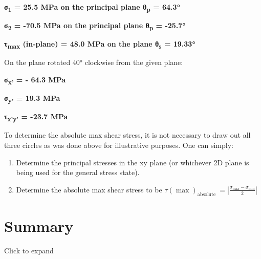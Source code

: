 \documentclass[
  letterpaper,
  DIV=11,
  numbers=noendperiod]{scrreprt}
\begin{document}
\begin{tcolorbox}
\begin{tcolorbox}
\textbf{σ\textsubscript{1} = 25.5 MPa on the principal plane
θ\textsubscript{p} = 64.3°}

\textbf{σ\textsubscript{2} = -70.5 MPa on the principal plane
θ\textsubscript{p} = -25.7°}

\textbf{τ\textsubscript{max} (in-plane) = 48.0 MPa on the plane
θ\textsubscript{s} = 19.33°}

On the plane rotated 40° clockwise from the given plane:

\textbf{σ\textsubscript{x'} = - 64.3 MPa}

\textbf{σ\textsubscript{y'} = 19.3 MPa}

\textbf{τ\textsubscript{x'y'} = -23.7 MPa}

\end{tcolorbox}

\end{tcolorbox}

\begin{tcolorbox}[enhanced jigsaw, breakable, opacityback=0, toptitle=1mm, left=2mm, colback=white, opacitybacktitle=0.6, colframe=quarto-callout-note-color-frame, titlerule=0mm, arc=.35mm, leftrule=.75mm, bottomtitle=1mm, colbacktitle=quarto-callout-note-color!10!white, rightrule=.15mm, title={Step-by-step: Determine Absolute Max Shear Stress}, bottomrule=.15mm, toprule=.15mm, coltitle=black]

To determine the absolute max shear stress, it is not necessary to draw
out all three circles as was done above for illustrative purposes. One
can simply:

\begin{enumerate}
\def\labelenumi{\arabic{enumi}.}
\item
  Determine the principal stresses in the xy plane (or whichever 2D
  plane is being used for the general stress state).
\item
  Determine the absolute max shear stress to be
  \(\tau(\max )_{\text {absolute }}=\left|\frac{\sigma_{\max }-\sigma_{\min }}{2}\right|\)
\end{enumerate}

\end{tcolorbox}

\section*{Summary}\label{summary-10}


Click to expand
\end{document}
